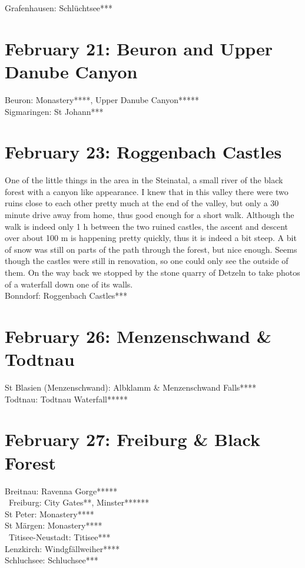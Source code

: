 Grafenhausen: Schl\"uchtsee***

\section{February 21: Beuron and Upper Danube Canyon}
\label{2021:Beuron}

Beuron: Monastery****, Upper Danube Canyon*****\\
Sigmaringen: St Johann***

\section{February 23: Roggenbach Castles}
\label{2021:Roggenbach}

One of the little things in the area in the Steinatal, a small river of the black forest with a canyon like appearance. I knew that in this valley there were two ruins close to each other pretty much at the end of the valley, but only a 30 minute drive away from home, thus good enough for a short walk. Although the walk is indeed only 1 h between the two ruined castles, the ascent and descent over about 100 m is happening pretty quickly, thus it is indeed a bit steep. A bit of snow was still on parts of the path through the forest, but nice enough. Seems though the castles were still in renovation, so one could only see the outside of them. On the way back we stopped by the stone quarry of Detzeln to take photos of a waterfall down one of its walls.\\

Bonndorf: Roggenbach Castles***

\section{February 26: Menzenschwand \& Todtnau}
\label{2021:Todtnau}

St Blasien (Menzenschwand): Albklamm \& Menzenschwand Falls****\\
Todtnau: Todtnau Waterfall*****

\section{February 27: Freiburg \& Black Forest}
\label{2021:Freiburg}

Breitnau: Ravenna Gorge*****\\\
Freiburg: City Gates**, Minster******\\
St Peter: Monastery****\\
St M\"argen: Monastery****\\\
Titisee-Neustadt: Titisee***\\
Lenzkirch: Windgf\"allweiher****\\
Schluchsee: Schluchsee***

